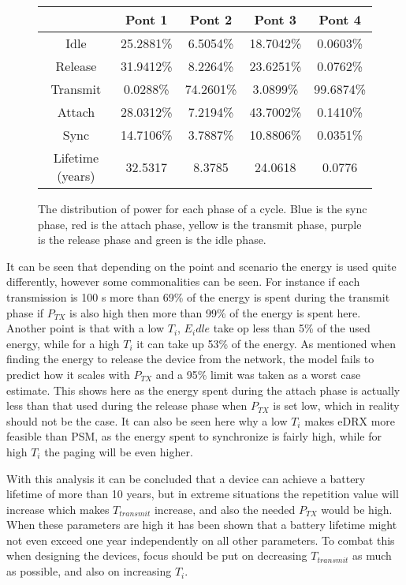 \begin{figure}[H]
\begin{minipage}{0.48\textwidth}
\begin{table}[H]
{\begin{tabular}{|c|c|c|c|c|}
 & Pont 1	& Pont 2	& Pont 3	& Pont 4	\\ \hline
\cellcolor{mycolor5}Idle	& 25.2881\% 	& 6.5054\%	& 18.7042\%	& 0.0603\%\\ \hline
\cellcolor{mycolor4}Release	& 31.9412\% 	& 8.2264\%	& 23.6251\%	& 0.0762\%\\ \hline
\cellcolor{mycolor3}Transmit	& 0.0288\% 	& 74.2601\%	& 3.0899\%	& 99.6874\%\\ \hline
\cellcolor{mycolor2}Attach	& 28.0312\% 	& 7.2194\%	& 43.7002\%	& 0.1410\%\\ \hline
\cellcolor{mycolor1}Sync	& 14.7106\% 	& 3.7887\%	& 10.8806\%	& 0.0351\%\\ \hline
Lifetime (years)	& 32.5317 	& 8.3785	& 24.0618	& 0.0776\\ \hline
\end{tabular}}
\end{table}
\end{minipage}
\caption{The distribution of power for each phase of a cycle. Blue is the sync phase, red is the attach phase, yellow is the transmit phase, purple is the release phase and green is the idle phase.}
\label{fig:barplot_plots}
\end{figure}

It can be seen that depending on the point and scenario the energy is used quite differently, however some commonalities can be seen. For instance if each transmission is 100 s more than 69\% of the energy is spent during the transmit phase if $P_{TX}$ is also high then more than 99\% of the energy is spent here. Another point is that with a low $T_i$, $E_idle$ take op less than 5\% of the used energy, while for a high $T_i$ it can take up 53\% of the energy. As mentioned when finding the energy to release the device from the network, the model fails to predict how it scales with $P_{TX}$ and a 95\% limit was taken as a worst case estimate. This shows here as the energy spent during the attach phase is actually less than that used during the release phase when $P_{TX}$ is set low, which in reality should not be the case. It can also be seen here why a low $T_i$ makes eDRX more feasible than PSM, as the energy spent to synchronize is fairly high, while for high $T_i$ the paging will be even higher.  

With this analysis it can be concluded that a device can achieve a battery lifetime of more than 10 years, but in extreme situations the repetition value will increase which makes $T_{transmit}$ increase, and also the needed $P_{TX}$ would be high. When these parameters are high it has been shown that a battery lifetime might not even exceed one year independently on all other parameters. To combat this when designing the devices, focus should be put on decreasing $T_{transmit}$ as much as possible, and also on increasing $T_i$. 
